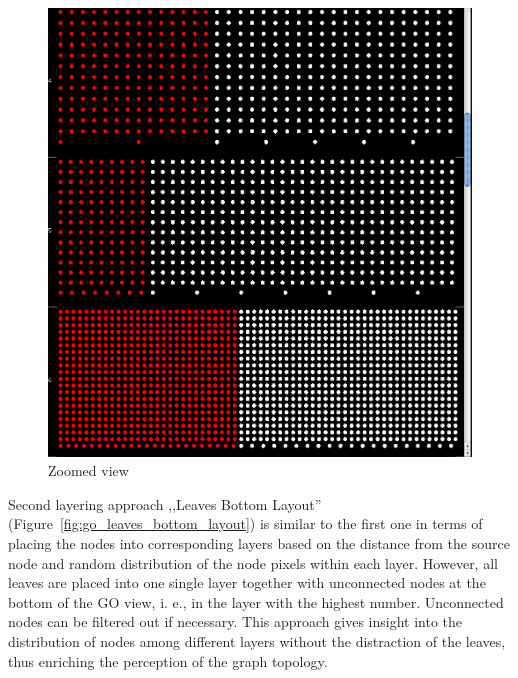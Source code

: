 \begin{figure}[h!]
\centering
\includegraphics[scale=0.3]{pictures/go_levels_layout_zoomed.png}
\caption{Zoomed view}
\label{fig:go_levels_layout_zoomed}
\end{figure}

Second layering approach ,,Leaves Bottom Layout'' (Figure~\ref{fig:go_leaves_bottom_layout}) is similar to the first one in terms of placing the nodes into corresponding layers based on the distance from the source node and random distribution of the node pixels within each layer. However, all leaves are placed into one single layer together with unconnected nodes at the bottom of the GO view, i. e., in the layer with the highest number. Unconnected nodes can be filtered out if necessary. This approach gives insight into the distribution of nodes among different layers without the distraction of the leaves, thus enriching the perception of the graph topology.


